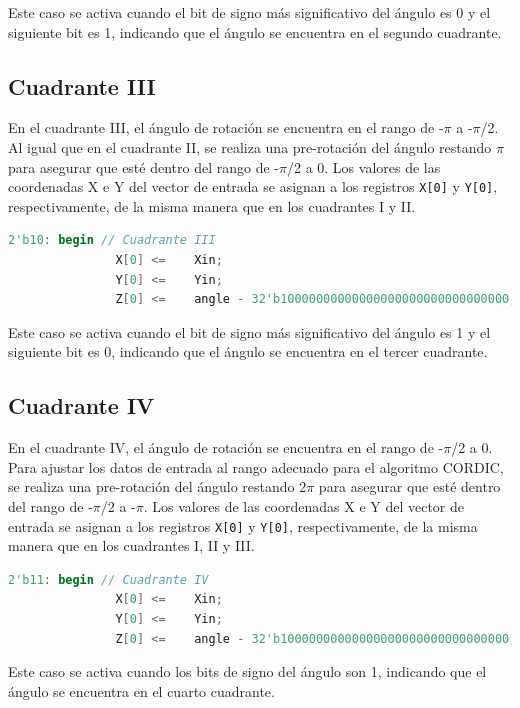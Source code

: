 \documentclass[12pt,a4paper, twoside]{article} %
\begin{document}
Este caso se activa cuando el bit de signo más significativo del ángulo es 0 y el siguiente bit es 1, indicando que el ángulo se encuentra en el segundo cuadrante.

\subsection{Cuadrante III}

En el cuadrante III, el ángulo de rotación se encuentra en el rango de -$\pi$ a -$\pi$/2. Al igual que en el cuadrante II, se realiza una pre-rotación del ángulo restando $\pi$ para asegurar que esté dentro del rango de -$\pi$/2 a 0. Los valores de las coordenadas X e Y del vector de entrada se asignan a los registros \texttt{X[0]} y \texttt{Y[0]}, respectivamente, de la misma manera que en los cuadrantes I y II.

\begin{lstlisting}[language=Verilog]
       2'b10: begin // Cuadrante III
               X[0] <=    Xin;
               Y[0] <=    Yin;
               Z[0] <=    angle - 32'b10000000000000000000000000000000; 
\end{lstlisting}

Este caso se activa cuando el bit de signo más significativo del ángulo es 1 y el siguiente bit es 0, indicando que el ángulo se encuentra en el tercer cuadrante.

\subsection{Cuadrante IV}

En el cuadrante IV, el ángulo de rotación se encuentra en el rango de -$\pi$/2 a 0. Para ajustar los datos de entrada al rango adecuado para el algoritmo CORDIC, se realiza una pre-rotación del ángulo restando 2$\pi$ para asegurar que esté dentro del rango de -$\pi$/2 a -$\pi$. Los valores de las coordenadas X e Y del vector de entrada se asignan a los registros \texttt{X[0]} y \texttt{Y[0]}, respectivamente, de la misma manera que en los cuadrantes I, II y III.

\begin{lstlisting}[language=Verilog]
       2'b11: begin // Cuadrante IV
               X[0] <=    Xin;
               Y[0] <=    Yin;
               Z[0] <=    angle - 32'b10000000000000000000000000000000; 
\end{lstlisting}

Este caso se activa cuando los bits de signo del ángulo son 1, indicando que el ángulo se encuentra en el cuarto cuadrante.
\end{document}
